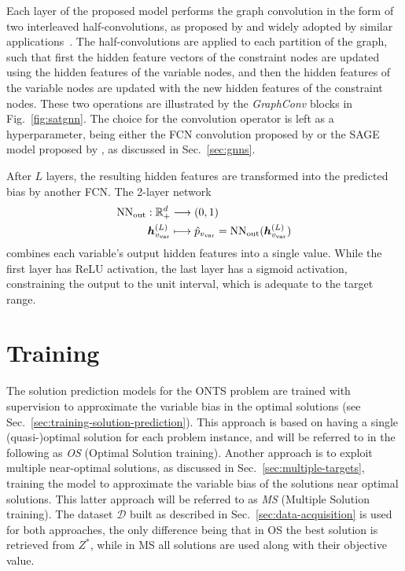 Each layer of the proposed model performs the graph convolution in the form of two interleaved half-convolutions, as proposed by  and widely adopted by similar applications~\cite{hanGNNGuidedPredictandSearchFramework2023,khalilMIPGNNDataDrivenFramework2022,dingAcceleratingPrimalSolution2020}.
The half-convolutions are applied to each partition of the graph, such that first the hidden feature vectors of the constraint nodes are updated using the hidden features of the variable nodes, and then the hidden features of the variable nodes are updated with the new hidden features of the constraint nodes.
These two operations are illustrated by the \emph{GraphConv} blocks in Fig.~\ref{fig:satgnn}.
The choice for the convolution operator is left as a hyperparameter, being either the FCN convolution proposed by  or the SAGE model proposed by , as discussed in Sec.~\ref{sec:gnns}.

After $L$ layers, the resulting hidden features are transformed into the predicted bias by another FCN.
The 2-layer network
\begin{align*}
    {\rm NN}_{\rm out}:\mathbb{R}^d_+& \longrightarrow \left( 0,1 \right)  \\
    \bm{h}^{(L)}_{v_{\rm var}} &\longmapsto \hat{p}_{v_{\rm var}} = {\rm NN}_{\rm out}(\bm{h}^{(L)}_{v_{\rm var}})
\end{align*}
combines each variable's output hidden features into a single value.
While the first layer has ReLU activation, the last layer has a sigmoid activation, constraining the output to the unit interval, which is adequate to the target range.

\section{Training}

The solution prediction models for the ONTS problem are trained with supervision to approximate the variable bias in the optimal solutions (see
Sec.~\ref{sec:training-solution-prediction}).
This approach is based on having a single (quasi-)optimal solution for each problem instance, and will be referred to in the following as \emph{OS} (Optimal Solution training).
Another approach is to exploit multiple near-optimal solutions, as discussed in Sec.~\ref{sec:multiple-targets}, training the model to approximate the variable bias of the solutions near optimal solutions.
This latter approach will be referred to as \emph{MS} (Multiple Solution training).
The dataset $\mathcal{D}$ built as described in Sec.~\ref{sec:data-acquisition} is used for both approaches, the only difference being that in OS the best solution is retrieved from $Z^{*}$, while in MS all solutions are used along with their objective value. 

